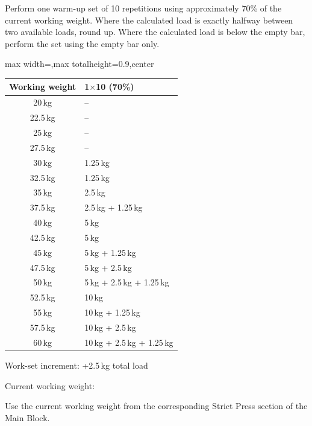 \documentclass[11pt,a4paper]{article}
\newcommand{\tablearraystretch}{1.15}
\begin{document}
Perform one warm-up set of 10 repetitions using approximately 70\% of the current working weight. Where the calculated load is exactly halfway between two available loads, round up. Where the calculated load is below the empty bar, perform the set using the empty bar only.

\begin{center}
\renewcommand{\arraystretch}{\tablearraystretch}
\begin{adjustbox}{max width=\linewidth,max totalheight=0.9\textheight,center}
\begin{tabular}{c p{5cm}}
\toprule
Working weight & 1$\times$10 (70\%) \\
\midrule
20\,kg   & -- \\
22.5\,kg & -- \\
25\,kg   & -- \\
27.5\,kg & -- \\
30\,kg   & 1.25\,kg \\
32.5\,kg & 1.25\,kg \\
35\,kg   & 2.5\,kg \\
37.5\,kg & 2.5\,kg + 1.25\,kg \\
40\,kg   & 5\,kg \\
42.5\,kg & 5\,kg \\
45\,kg   & 5\,kg + 1.25\,kg \\
47.5\,kg & 5\,kg + 2.5\,kg \\
50\,kg   & 5\,kg + 2.5\,kg + 1.25\,kg \\
52.5\,kg & 10\,kg \\
55\,kg   & 10\,kg + 1.25\,kg \\
57.5\,kg & 10\,kg + 2.5\,kg \\
60\,kg   & 10\,kg + 2.5\,kg + 1.25\,kg \\
\bottomrule
\end{tabular}
\end{adjustbox}
\renewcommand{\arraystretch}{1}
\end{center}

Work-set increment: +2.5\,kg total load

Current working weight:

Use the current working weight from the corresponding Strict Press section of the Main Block.
\end{document}
